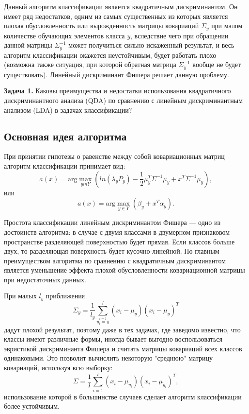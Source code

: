 Данный алгоритм классификации является квадратичным дискриминантом. Он имеет ряд недостатков, одним из самых существенных из которых является плохая обусловленность или вырожденность матрицы ковариаций $\Sigma_y$ при малом количестве обучающих элементов класса $y$, вследствие чего при обращении данной матрицы $\Sigma^{-1}_{y}$ может получиться сильно искаженный результат, и весь алгоритм классификации окажется неустойчивым, будет работать плохо (возможна также ситуация, при которой обратная матрица $\Sigma^{-1}_{y}$ вообще не будет существовать). Линейный дискриминант Фишера решает данную проблему.

\textbf{Задача 1.} Каковы преимущества и недостатки использования квадратичного дискриминантного анализа (QDA) по сравнению с линейным дискриминантным анализом (LDA) в задачах классификации?


\subsection*{Основная идея алгоритма}

При принятии гипотезы о равенстве между собой ковариационных матриц алгоритм классификации принимает вид:
\[
a(x) = \mathrm{arg}\max_{yin Y} \left( ln(\lambda_{y} P_y) - \frac{1}{2}\mu_{y}^{T} \Sigma^{-1} \mu_y + x^T \Sigma^{-1} \mu_y \right),
\]
или
\[
a(x) = \mathrm{arg}\max_{y\in Y} (\beta_y + x^T\alpha_y).
\]

Простота классификации линейным дискриминантом Фишера — одно из достоинств алгоритма: в случае с двумя классами в двумерном признаковом пространстве разделяющей поверхностью будет прямая. Если классов больше двух, то разделяющая поверхность будет кусочно-линейной. Но главным преимуществом алгоритма по сравнению с квадратичным дискриминантом является уменьшение эффекта плохой обусловленности ковариационной матрицы при недостаточных данных.

При малых $l_y$ приближения
\[
\Sigma_y = \frac{1}{l_y} \sum^{l}_{\stackrel{i=1}{y_i = y}}(x_i - \mu_y)(x_i - \mu_y)^T
\]
дадут плохой результат, поэтому даже в тех задачах, где заведомо известно, что классы имеют различные формы, иногда бывает выгодно воспользоваться эвристикой дискриминанта Фишера и считать матрицы ковариаций всех классов одинаковыми. Это позволит вычислить некоторую "среднюю" матрицу ковариаций, используя всю выборку:
\[
\Sigma = \frac{1}{l} \sum^{l}_{i=1}(x_i - \mu_{y_i})(x_i - \mu_{y_i})^T,
\]
использование которой в большинстве случаев сделает алгоритм классификации более устойчивым.

